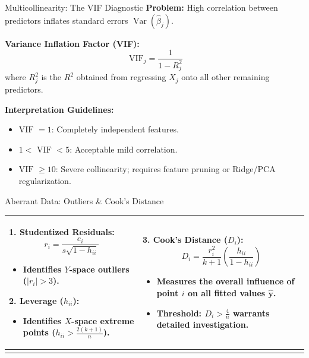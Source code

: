 \documentclass[aspectratio=169,ignorenonframetext]{beamer}
\begin{document}
\begin{frame}{Multicollinearity: The VIF Diagnostic}
\textbf{Problem:} High correlation between predictors inflates standard
errors \(\operatorname{Var}({\hat{\beta}}_{j})\).

\textbf{Variance Inflation Factor (VIF):}
\[\text{ VIF}_{j} = \frac{1}{1 - R_{j}^{2}}\] where \(R_{j}^{2}\) is the
\(R^{2}\) obtained from regressing \(X_{j}\) onto all other remaining
predictors.

\textbf{Interpretation Guidelines:}

\begin{itemize}
\item
  \(\text{VIF } = 1\): Completely independent features.
\item
  \(1 < \text{ VIF } < 5\): Acceptable mild correlation.
\item
  \(\text{VIF } \geq 10\): Severe collinearity; requires feature pruning
  or Ridge/PCA regularization.
\end{itemize}
\end{frame}

\begin{frame}{Aberrant Data: Outliers \& Cook's Distance}
{\def\LTcaptype{none} %
\begin{longtable}[]{@{}
  >{\raggedright\arraybackslash}p{}
  >{\raggedright\arraybackslash}p{}@{}}
\toprule\noalign{}
\endhead
\begin{minipage}[t]{\linewidth}\raggedright
\textbf{1. Studentized Residuals:}
\[r_{i} = \frac{e_{i}}{s\sqrt{1 - h_{ii}}}\]

\begin{itemize}
\item
  Identifies \(Y\)-space outliers (\(|r_{i}| > 3\)).
\end{itemize}

\textbf{2. Leverage (\(h_{ii}\)):}

\begin{itemize}
\item
  Identifies \(X\)-space extreme points
  (\(h_{ii} > \frac{2(k + 1)}{n}\)).
\end{itemize}
\end{minipage} & \begin{minipage}[t]{\linewidth}\raggedright
\textbf{3. Cook's Distance (\(D_{i}\)):}
\[D_{i} = \frac{r_{i}^{2}}{k + 1}\left( \frac{h_{ii}}{1 - h_{ii}} \right)\]

\begin{itemize}
\item
  Measures the overall influence of point \(i\) on \textbf{all} fitted
  values \(\hat{\mathbf{y}}\).
\item
  Threshold: \(D_{i} > \frac{4}{n}\) warrants detailed investigation.
\end{itemize}
\end{minipage} \\
\bottomrule\noalign{}
\end{longtable}
}
\end{frame}
\end{document}
